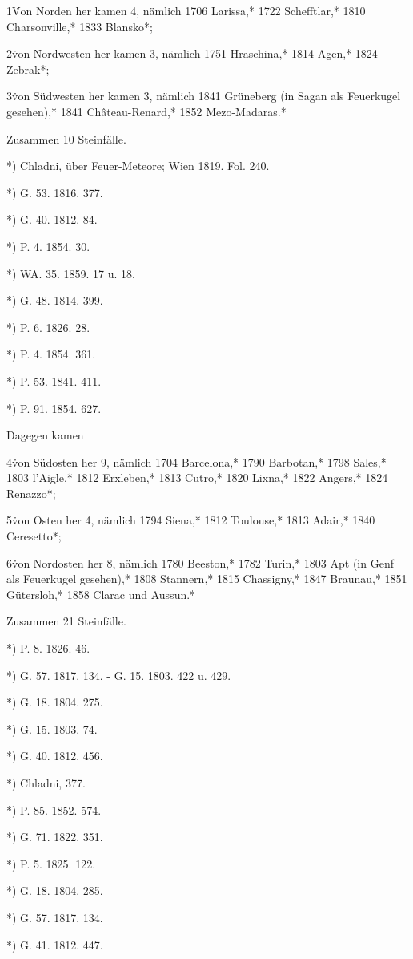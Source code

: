 \documentclass[a4paper, 8pt, oneside, polutonikogreek, german]{article}
\begin{document}
1\. Von Norden her kamen 4, nämlich 1706 Larissa,* 1722 Schefftlar,* 1810 Charsonville,* 1833 Blansko*;

2\. von Nordwesten her kamen 3, nämlich 1751 Hraschina,* 1814 Agen,* 1824 Zebrak*;

3\. von Südwesten her kamen 3, nämlich 1841 Grüneberg (in Sagan als Feuerkugel gesehen),* 1841 Château-Renard,* 1852 Mezo-Madaras.*

Zusammen 10 Steinfälle.

*) Chladni, über Feuer-Meteore; Wien 1819. Fol. 240.

*) G. 53. 1816. 377.

*) G. 40. 1812. 84.

*) P. 4. 1854. 30.

*) WA. 35. 1859. 17 u. 18.

*) G. 48. 1814. 399.

*) P. 6. 1826. 28.

*) P. 4. 1854. 361.

*) P. 53. 1841. 411.

*) P. 91. 1854. 627.

Dagegen kamen

4\. von Südosten her 9, nämlich 1704 Barcelona,* 1790 Barbotan,* 1798 Sales,* 1803 l'Aigle,* 1812 Erxleben,* 1813 Cutro,* 1820 Lixna,* 1822 Angers,* 1824 Renazzo*;

5\. von Osten her 4, nämlich 1794 Siena,* 1812 Toulouse,* 1813 Adair,* 1840 Ceresetto*;

6\. von Nordosten her 8, nämlich 1780 Beeston,* 1782 Turin,* 1803 Apt (in Genf als Feuerkugel gesehen),* 1808 Stannern,* 1815 Chassigny,* 1847 Braunau,* 1851 Gütersloh,* 1858 Clarac und Aussun.*

Zusammen 21 Steinfälle.

*) P. 8. 1826. 46.

*) G. 57. 1817. 134. - G. 15. 1803. 422 u. 429.

*) G. 18. 1804. 275.

*) G. 15. 1803. 74.

*) G. 40. 1812. 456.

*) Chladni, 377.

*) P. 85. 1852. 574.

*) G. 71. 1822. 351.

*) P. 5. 1825. 122.

*) G. 18. 1804. 285.

*) G. 57. 1817. 134.

*) G. 41. 1812. 447.
\end{document}
